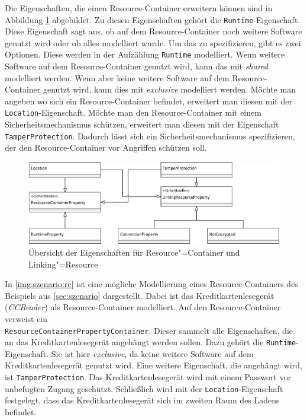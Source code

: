 Die Eigenschaften, die einen Resource-Container erweitern können sind in Abbildung \ref{img:modell:stereotypes:properties} abgebildet. Zu diesen Eigenschaften gehört die \texttt{Runtime}-Eigenschaft. Diese Eigenschaft sagt aus, ob auf dem Resource-Container noch weitere Software genutzt wird oder ob alles modelliert wurde. Um das zu spezifizieren, gibt es zwei Optionen. Diese werden in der Aufzählung \texttt{Runtime} modelliert. Wenn weitere Software auf dem Resource-Container genutzt wird, kann das mit \textit{shared} modelliert werden. Wenn aber keine weitere Software auf dem Resource-Container genutzt wird, kann dies mit \textit{exclusive} modelliert werden. Möchte man angeben wo sich ein Resource-Container befindet, erweitert man diesen mit der \texttt{Location}-Eigenschaft. Möchte man den Resource-Container mit einem Sicherheitsmechanismus schützen, erweitert man diesen mit der Eigenschaft \texttt{TamperProtection}. Dadurch lässt sich ein Sicherheitsmechanismus spezifizieren, der den Resource-Container vor Angriffen schützen soll. \par
\begin{figure}[h]
	\centering
  	\includegraphics[width=1\textwidth]{images/meta_stereotypes_properties.png}
	\caption{Übersicht der Eigenschaften für Resource"=Container und Linking"=Resource}
	\label{img:modell:stereotypes:properties}
\end{figure}
In \autoref{img:szenario:rc} ist eine mögliche Modellierung eines Resource-Containers des Beispiels aus \autoref{sec:szenario} dargestellt. 
Dabei ist das Kreditkartenlesegerät (\textit{CCReader}) als Resource-Container modelliert. Auf den Resource-Container verweist ein \\\texttt{ResourceContainerPropertyContainer}. Dieser sammelt alle Eigenschaften, die an das Kreditkartenlesegerät angehängt werden sollen. Dazu gehört die \texttt{Runtime}-Eigenschaft. Sie ist hier \textit{exclusive}, da keine weitere Software auf dem Kreditkartenlesegerät genutzt wird. Eine weitere Eigenschaft, die angehängt wird, ist  \texttt{TamperProtection}. Das Kreditkartenlesegerät wird mit einem Passwort vor unbefugten Zugang geschützt. Schließlich wird mit der \texttt{Location}-Eigenschaft festgelegt, dass das Kreditkartenlesegerät sich im zweiten Raum des Ladens befindet. 

